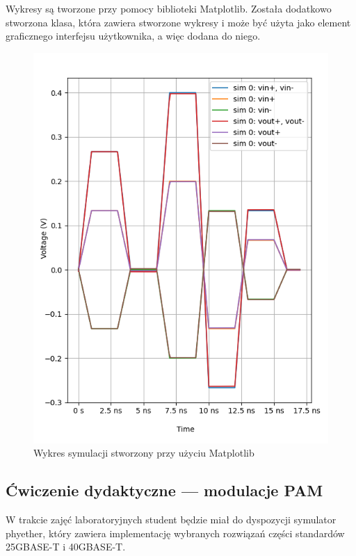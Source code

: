 Wykresy są tworzone przy pomocy biblioteki Matplotlib. Została dodatkowo stworzona klasa, która zawiera stworzone wykresy i może być użyta jako element graficznego interfejsu użytkownika, a więc dodana do niego.

\begin{figure}[ht]
    \centering
    \includegraphics[scale=0.5]{images/wykres.png}
    \caption{Wykres symulacji stworzony przy użyciu Matplotlib}
    \label{fig:wykres_image}
\end{figure}

\subsection{Ćwiczenie dydaktyczne --- modulacje PAM}

W trakcie zajęć laboratoryjnych student będzie miał do dyspozycji symulator phyether, który zawiera implementację wybranych rozwiązań
części standardów 25GBASE-T i 40GBASE-T.

